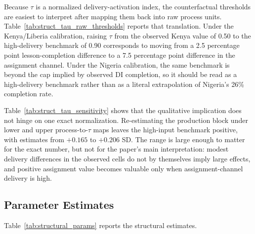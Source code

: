 \documentclass[11pt]{article}
\begin{document}


Because $\tau$ is a normalized delivery-activation index, the counterfactual thresholds are easiest to interpret after mapping them back into raw process units. Table~\ref{tab:struct_tau_raw_thresholds} reports that translation. Under the Kenya/Liberia calibration, raising $\tau$ from the observed Kenya value of 0.50 to the high-delivery benchmark of 0.90 corresponds to moving from a 2.5 percentage point lesson-completion difference to a 7.5 percentage point difference in the assignment channel. Under the Nigeria calibration, the same benchmark is beyond the cap implied by observed DI completion, so it should be read as a high-delivery benchmark rather than as a literal extrapolation of Nigeria's 26\% completion rate.



Table~\ref{tab:struct_tau_sensitivity} shows that the qualitative implication does not hinge on one exact normalization. Re-estimating the production block under lower and upper process-to-$\tau$ maps leaves the high-input benchmark positive, with estimates from $+0.165$ to $+0.206$ SD. The range is large enough to matter for the exact number, but not for the paper's main interpretation: modest delivery differences in the observed cells do not by themselves imply large effects, and positive assignment value becomes valuable only when assignment-channel delivery is high.



\subsection{Parameter Estimates}
\label{subsec:struct_estimates}

Table~\ref{tab:structural_params} reports the structural estimates.


\end{document}
